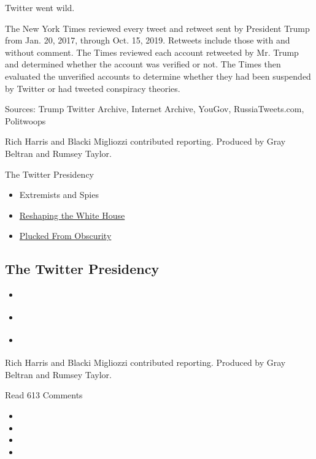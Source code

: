 Twitter went wild.

The New York Times reviewed every tweet and retweet sent by President
Trump from Jan. 20, 2017, through Oct. 15, 2019. Retweets include those
with and without comment. The Times reviewed each account retweeted by
Mr. Trump and determined whether the account was verified or not. The
Times then evaluated the unverified accounts to determine whether they
had been suspended by Twitter or had tweeted conspiracy theories.

Sources: Trump Twitter Archive, Internet Archive, YouGov,
RussiaTweets.com, Politwoops

Rich Harris and Blacki Migliozzi contributed reporting. Produced by Gray
Beltran and Rumsey Taylor.

The Twitter Presidency

\begin{itemize}
\tightlist
\item
  Extremists and Spies
\item
  \href{https://www.nytimes.com/interactive/2019/11/02/us/politics/trump-twitter-presidency.html\%0A}{Reshaping
  the White House}
\item
  \href{https://www.nytimes.com/interactive/2019/11/02/us/politics/trump-twitter-retweets.html\%0A}{Plucked
  From Obscurity}
\end{itemize}

\hypertarget{the-twitter-presidency}{%
\subsection{The Twitter Presidency}\label{the-twitter-presidency}}

\begin{itemize}
\tightlist
\item
  \href{https://www.nytimes.com/interactive/2019/11/02/us/politics/trump-twitter-presidency.html\%0A}{}
\item
  \href{https://www.nytimes.com/interactive/2019/11/02/us/politics/trump-twitter-retweets.html\%0A}{}
\item
  \href{https://www.nytimes.com/2019/11/02/us/trump-twitter-takeaways.html}{}
\end{itemize}

Rich Harris and Blacki Migliozzi contributed reporting. Produced by Gray
Beltran and Rumsey Taylor.

Read 613 Comments

\begin{itemize}
\item
\item
\item
\item
\end{itemize}

